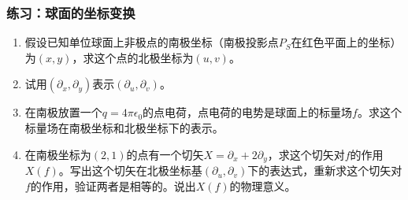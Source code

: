 \documentclass[CJK]{beamer}
\begin{document}
\begin{frame}
\frametitle{\bch 练习：球面的坐标变换 \ech}
\bch
\begin{enumerate}
\item 假设已知单位球面上非极点的南极坐标（南极投影点$P_S$在红色平面上的坐标）为$(x,y)$，求这个点的北极坐标为$(u,v)$。
\item 试用$(\partial_x,\partial_y)$表示$(\partial_u,\partial_v)$。
\item 在南极放置一个$q=4\pi\epsilon_0$的点电荷，点电荷的电势是球面上的标量场$f$。求这个标量场在南极坐标和北极坐标下的表示。
\item 在南极坐标为$(2,1)$的点有一个切矢$X = \partial_x + 2 \partial_y$，求这个切矢对$f$的作用$X(f)$。写出这个切矢在北极坐标基$(\partial_u,\partial_v)$下的表达式，重新求这个切矢对$f$的作用，验证两者是相等的。说出$X(f)$的物理意义。
\end{enumerate}
\ech
\end{frame}
\end{document}
